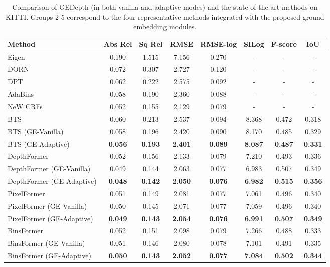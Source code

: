 \documentclass[10pt,twocolumn,letterpaper]{article}
\begin{document}
\begin{table*}[t]
\small
\begin{center}
\begin{tabular}{lccccccc}
\hline
Method & Abs Rel  &  Sq Rel  & RMSE  & RMSE-log  & SILog  & F-score  &  IoU \\
\hline
Eigen~\cite{eigen2014depth} & 0.190 & 1.515 & 7.156 & 0.270 & -&-&-\\
DORN~\cite{fu2018deep}         & 0.072 & 0.307 & 2.727 & 0.120 &  -&-&-\\
DPT~\cite{ranftl2021vision}          & 0.062 & 0.222 & 2.575 & 0.092 &-&-&-\\
AdaBins~\cite{bhat2021adabins}       & 0.058 & 0.190 & 2.360 & 0.088 &-&-&-\\
NeW CRFs~\cite{yuan2022new}     & 0.052 & 0.155 & 2.129 & 0.079 &-&-&-\\
\hline
BTS~\cite{lee2019big}& 0.060 & 0.213 & 2.537 & 0.094 & 8.368 & 0.472 & 0.318\\
BTS (GE-Vanilla)& 0.058 & 0.196 & 2.420 & 0.090 & 8.170 & 0.485 & 0.329\\
BTS (GE-Adaptive)& \textbf{0.056} & \textbf{0.193} & \textbf{2.401} & \textbf{0.089} & \textbf{8.087} & \textbf{0.487} & \textbf{0.331}\\ \hline
DepthFormer~\cite{li2022depthformer}  & 0.052 & 0.156 & 2.133 & 0.079 & 7.210& 0.493 & 0.336\\
DepthFormer (GE-Vanilla)& 0.049 & 0.144 & 2.063 & 0.077 & 6.983 & 0.507 & 0.349\\
DepthFormer (GE-Adaptive)& \textbf{0.048} & \textbf{0.142} & \textbf{2.050} & \textbf{0.076} & \textbf{6.982} &\textbf{0.515}&\textbf{0.356}\\ 
\hline
PixelFormer~\cite{agarwal2023attention}  & 0.051 & 0.149 & 2.081 & 0.077 &7.061& 0.496 &0.340\\
PixelFormer (GE-Vanilla)& 0.050 & 0.145 & 2.071 & 0.077  & 7.059 & 0.496 & 0.340\\
PixelFormer (GE-Adaptive)& \textbf{0.049} & \textbf{0.143} & \textbf{2.054} & \textbf{0.076} &\textbf{6.991}&\textbf{0.507}&\textbf{0.349}\\ \hline
BinsFormer~\cite{li2022binsformer}  & 0.052 & 0.151 & 2.098 & 0.079 &7.266& 0.488 &0.333\\
BinsFormer (GE-Vanilla)& 0.051 & 0.146 & 2.080 & 0.078 &7.101&0.491&0.335\\
BinsFormer (GE-Adaptive)& \textbf{0.050} & \textbf{0.143} & \textbf{2.052} & \textbf{0.077} &\textbf{7.084}&\textbf{0.502}&\textbf{0.344}\\ \hline
\end{tabular}
\end{center}
\vspace{-4pt}
\caption{Comparison of GEDepth (in both vanilla and adaptive modes) and the state-of-the-art methods on KITTI. Groups 2-5 correspond to the four representative methods integrated with the proposed ground embedding modules.} 
\vspace{-2pt}
\label{tab:kitti_results}
\end{table*}
\end{document}
